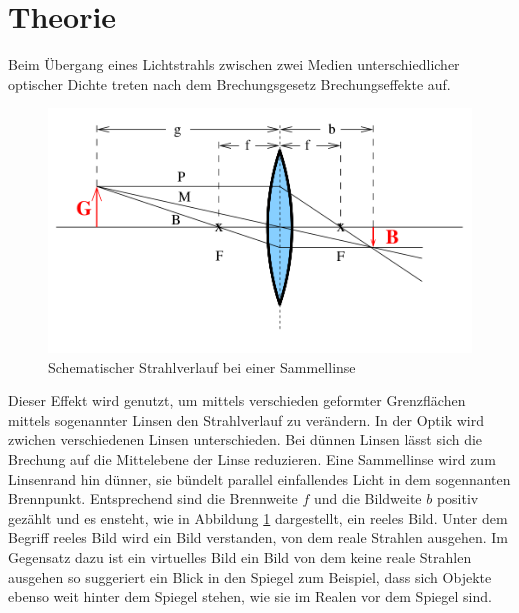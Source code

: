 \section{Theorie}
\label{sec:Theorie}
Beim Übergang eines Lichtstrahls zwischen zwei Medien unterschiedlicher optischer Dichte treten nach dem Brechungsgesetz Brechungseffekte auf.
\begin{figure}
  \includegraphics[width=\linewidth]{Bilder/sammellinse.png}
  \caption{Schematischer Strahlverlauf bei einer Sammellinse \cite{Anleitung}}
  \label{fig:sammelli}
\end{figure}
\FloatBarrier
Dieser Effekt wird genutzt, um mittels verschieden geformter Grenzflächen mittels sogenannter Linsen den Strahlverlauf zu verändern.
In der Optik wird zwichen verschiedenen Linsen unterschieden.
Bei dünnen Linsen lässt sich die Brechung auf die Mittelebene der Linse reduzieren.
Eine Sammellinse wird zum Linsenrand hin dünner, sie bündelt parallel einfallendes Licht in dem sogennanten Brennpunkt. Entsprechend sind die Brennweite $f$ und die Bildweite $b$ positiv gezählt und es ensteht, wie in Abbildung \ref{fig:sammelli} dargestellt, ein reeles Bild.
Unter dem Begriff reeles Bild wird ein Bild verstanden, von dem reale Strahlen ausgehen. Im Gegensatz dazu ist ein virtuelles Bild ein Bild von dem keine reale Strahlen ausgehen so suggeriert ein Blick in den Spiegel zum Beispiel, dass sich Objekte ebenso weit hinter dem Spiegel stehen, wie sie im Realen vor dem Spiegel sind.

